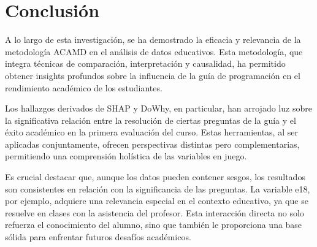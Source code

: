 


\section{Conclusión}

A lo largo de esta investigación, se ha demostrado la eficacia y relevancia de la metodología ACAMD en el análisis de datos educativos. Esta metodología, que integra técnicas de comparación, interpretación y causalidad, ha permitido obtener insights profundos sobre la influencia de la guía de programación en el rendimiento académico de los estudiantes.

Los hallazgos derivados de SHAP y DoWhy, en particular, han arrojado luz sobre la significativa relación entre la resolución de ciertas preguntas de la guía y el éxito académico en la primera evaluación del curso. Estas herramientas, al ser aplicadas conjuntamente, ofrecen perspectivas distintas pero complementarias, permitiendo una comprensión holística de las variables en juego.

Es crucial destacar que, aunque los datos pueden contener sesgos, los resultados son consistentes en relación con la significancia de las preguntas. La variable e18, por ejemplo, adquiere una relevancia especial en el contexto educativo, ya que se resuelve en clases con la asistencia del profesor. Esta interacción directa no solo refuerza el conocimiento del alumno, sino que también le proporciona una base sólida para enfrentar futuros desafíos académicos.

